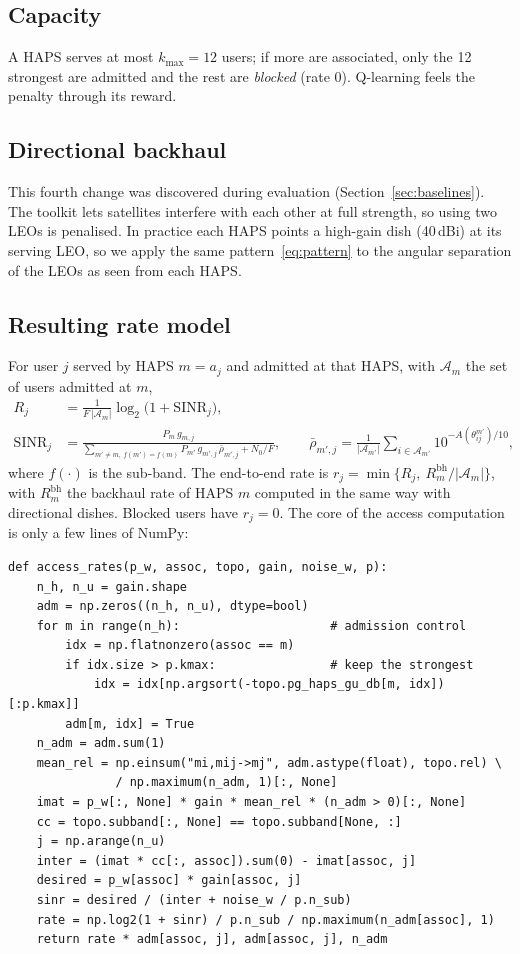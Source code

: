 \documentclass[11pt,a4paper]{article}
\begin{document}
\subsection{Capacity}
A HAPS serves at most $k_{\max}=12$ users; if more are associated, only the 12 strongest are admitted and the rest are \emph{blocked} (rate 0). Q-learning feels the penalty through its reward.

\subsection{Directional backhaul}
This fourth change was discovered during evaluation (Section~\ref{sec:baselines}). The toolkit lets satellites interfere with each other at full strength, so using two LEOs is penalised. In practice each HAPS points a high-gain dish (40\,dBi) at its serving LEO, so we apply the same pattern~\eqref{eq:pattern} to the angular separation of the LEOs as seen from each HAPS.

\subsection{Resulting rate model}
For user $j$ served by HAPS $m=a_j$ and admitted at that HAPS, with $\mathcal{A}_m$ the set of users admitted at $m$,
\begin{align}
  R_j &= \frac{1}{F\,|\mathcal{A}_m|}\log_2\!\big(1+\mathrm{SINR}_j\big),\\
  \mathrm{SINR}_j &= \frac{P_m\, g_{m,j}}{\sum_{m'\neq m,\ f(m')=f(m)} P_{m'}\, g_{m',j}\,\bar\rho_{m',j}+N_0/F},\qquad
  \bar\rho_{m',j}=\frac{1}{|\mathcal{A}_{m'}|}\sum_{i\in\mathcal{A}_{m'}}10^{-A(\theta^{m'}_{ij})/10},
\end{align}
where $f(\cdot)$ is the sub-band. The end-to-end rate is $r_j=\min\{R_j,\ R^{\mathrm{bh}}_{m}/|\mathcal{A}_m|\}$, with $R^{\mathrm{bh}}_m$ the backhaul rate of HAPS $m$ computed in the same way with directional dishes. Blocked users have $r_j=0$. The core of the access computation is only a few lines of NumPy:
\begin{lstlisting}
def access_rates(p_w, assoc, topo, gain, noise_w, p):
    n_h, n_u = gain.shape
    adm = np.zeros((n_h, n_u), dtype=bool)
    for m in range(n_h):                     # admission control
        idx = np.flatnonzero(assoc == m)
        if idx.size > p.kmax:                # keep the strongest
            idx = idx[np.argsort(-topo.pg_haps_gu_db[m, idx])[:p.kmax]]
        adm[m, idx] = True
    n_adm = adm.sum(1)
    mean_rel = np.einsum("mi,mij->mj", adm.astype(float), topo.rel) \
               / np.maximum(n_adm, 1)[:, None]
    imat = p_w[:, None] * gain * mean_rel * (n_adm > 0)[:, None]
    cc = topo.subband[:, None] == topo.subband[None, :]
    j = np.arange(n_u)
    inter = (imat * cc[:, assoc]).sum(0) - imat[assoc, j]
    desired = p_w[assoc] * gain[assoc, j]
    sinr = desired / (inter + noise_w / p.n_sub)
    rate = np.log2(1 + sinr) / p.n_sub / np.maximum(n_adm[assoc], 1)
    return rate * adm[assoc, j], adm[assoc, j], n_adm
\end{lstlisting}
\end{document}
